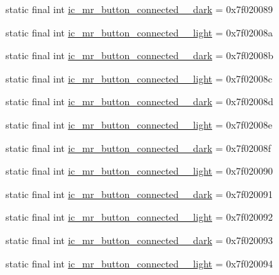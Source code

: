 \begin{CompactItemize}
\item 
static final int \hyperlink{classandroid_1_1support_1_1v7_1_1cardview_1_1_r_1_1drawable_d15bac72a9cd8907f321fcefe156553a}{ic\_\-mr\_\-button\_\-connected\_\_\-dark} = 0x7f020089
\item 
static final int \hyperlink{classandroid_1_1support_1_1v7_1_1cardview_1_1_r_1_1drawable_529addea4bca803f19883bb2ea8ff2dc}{ic\_\-mr\_\-button\_\-connected\_\_\-light} = 0x7f02008a
\item 
static final int \hyperlink{classandroid_1_1support_1_1v7_1_1cardview_1_1_r_1_1drawable_cbdafd87d7009fb1aa21f28246b7b9df}{ic\_\-mr\_\-button\_\-connected\_\_\-dark} = 0x7f02008b
\item 
static final int \hyperlink{classandroid_1_1support_1_1v7_1_1cardview_1_1_r_1_1drawable_4905d16e4cb11c88704bbcffbae3a71e}{ic\_\-mr\_\-button\_\-connected\_\_\-light} = 0x7f02008c
\item 
static final int \hyperlink{classandroid_1_1support_1_1v7_1_1cardview_1_1_r_1_1drawable_afe6b12c5403e82a6469ef224bd43204}{ic\_\-mr\_\-button\_\-connected\_\_\-dark} = 0x7f02008d
\item 
static final int \hyperlink{classandroid_1_1support_1_1v7_1_1cardview_1_1_r_1_1drawable_86969cae3a0e0d020a0d5b54f0ac5043}{ic\_\-mr\_\-button\_\-connected\_\_\-light} = 0x7f02008e
\item 
static final int \hyperlink{classandroid_1_1support_1_1v7_1_1cardview_1_1_r_1_1drawable_bbabc5a74f19123021dd50e5ad6f40b4}{ic\_\-mr\_\-button\_\-connected\_\_\-dark} = 0x7f02008f
\item 
static final int \hyperlink{classandroid_1_1support_1_1v7_1_1cardview_1_1_r_1_1drawable_482075943f5b05dc2ede52069951773e}{ic\_\-mr\_\-button\_\-connected\_\_\-light} = 0x7f020090
\item 
static final int \hyperlink{classandroid_1_1support_1_1v7_1_1cardview_1_1_r_1_1drawable_84b3ffdb457ddf45bd7716bae3fd6529}{ic\_\-mr\_\-button\_\-connected\_\_\-dark} = 0x7f020091
\item 
static final int \hyperlink{classandroid_1_1support_1_1v7_1_1cardview_1_1_r_1_1drawable_88e3520ac717f1398dd8e18cca162a94}{ic\_\-mr\_\-button\_\-connected\_\_\-light} = 0x7f020092
\item 
static final int \hyperlink{classandroid_1_1support_1_1v7_1_1cardview_1_1_r_1_1drawable_525f0401a334b122ea0ebf46a94a2a9f}{ic\_\-mr\_\-button\_\-connected\_\_\-dark} = 0x7f020093
\item 
static final int \hyperlink{classandroid_1_1support_1_1v7_1_1cardview_1_1_r_1_1drawable_1bd54b15f735b55c4bd14b90abef3eb5}{ic\_\-mr\_\-button\_\-connected\_\_\-light} = 0x7f020094

\end{CompactItemize}
